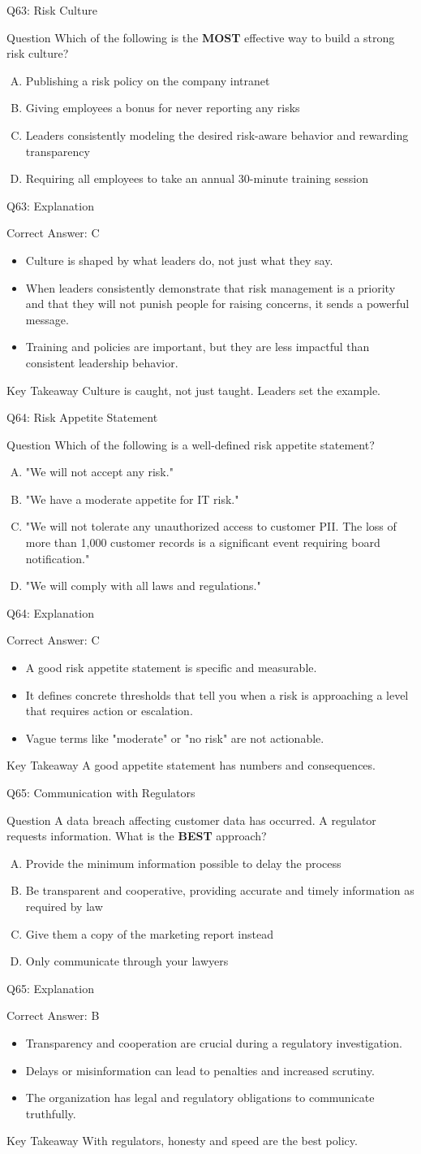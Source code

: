 \documentclass[aspectratio=169]{beamer}
\newcommand{\hq}[7]{%
	\begin{frame}{Q#1: #2}
		\begin{block}{Question}
			#3
		\end{block}
		\begin{enumerate}[(A)]
			#4
		\end{enumerate}
	\end{frame}
	\begin{frame}{Q#1: Explanation}
		\begin{block}{Correct Answer: #5}
			\begin{itemize}
				#6
			\end{itemize}
		\end{block}
		\begin{alertblock}{Key Takeaway}
			#7
		\end{alertblock}
	\end{frame}
}
\begin{document}
	\hq{63}{Risk Culture}
	{Which of the following is the \textbf{MOST} effective way to build a strong risk culture?}
	{\item Publishing a risk policy on the company intranet
		\item Giving employees a bonus for never reporting any risks
		\item Leaders consistently modeling the desired risk-aware behavior and rewarding transparency
		\item Requiring all employees to take an annual 30-minute training session}
	{C}
	{\item Culture is shaped by what leaders do, not just what they say.
		\item When leaders consistently demonstrate that risk management is a priority and that they will not punish people for raising concerns, it sends a powerful message.
		\item Training and policies are important, but they are less impactful than consistent leadership behavior.}
	{Culture is caught, not just taught. Leaders set the example.}
	
	\hq{64}{Risk Appetite Statement}
	{Which of the following is a well-defined risk appetite statement?}
	{\item "We will not accept any risk."
		\item "We have a moderate appetite for IT risk."
		\item "We will not tolerate any unauthorized access to customer PII. The loss of more than 1,000 customer records is a significant event requiring board notification."
		\item "We will comply with all laws and regulations."}
	{C}
	{\item A good risk appetite statement is specific and measurable.
		\item It defines concrete thresholds that tell you when a risk is approaching a level that requires action or escalation.
		\item Vague terms like "moderate" or "no risk" are not actionable.}
	{A good appetite statement has numbers and consequences.}
	
	\hq{65}{Communication with Regulators}
	{A data breach affecting customer data has occurred. A regulator requests information. What is the \textbf{BEST} approach?}
	{\item Provide the minimum information possible to delay the process
		\item Be transparent and cooperative, providing accurate and timely information as required by law
		\item Give them a copy of the marketing report instead
		\item Only communicate through your lawyers}
	{B}
	{\item Transparency and cooperation are crucial during a regulatory investigation.
		\item Delays or misinformation can lead to penalties and increased scrutiny.
		\item The organization has legal and regulatory obligations to communicate truthfully.}
	{With regulators, honesty and speed are the best policy.}
	
\end{document}

